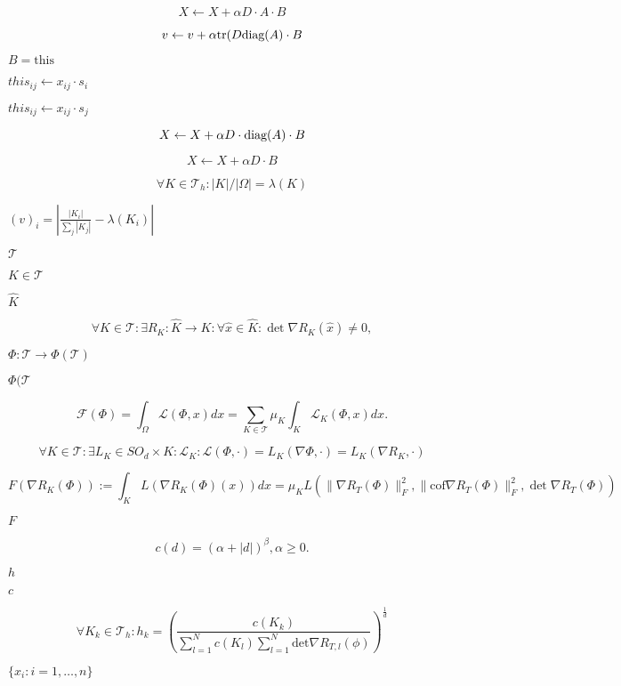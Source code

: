 \documentclass{article}
\begin{document}
\[ X \leftarrow X + \alpha D\cdot A\cdot B\]
\pagebreak

\[ v \leftarrow v + \alpha \mathrm{tr}( D \textnormal{diag}(A) \cdot B\]
\pagebreak

$ B = \mathrm{this} $
\pagebreak

$ this_{ij} \leftarrow x_{ij}\cdot s_i$
\pagebreak

$ this_{ij} \leftarrow x_{ij}\cdot s_j$
\pagebreak

\[ X \leftarrow X + \alpha D\cdot \textnormal{diag}(A)\cdot B\]
\pagebreak

\[ X \leftarrow X + \alpha D\cdot B\]
\pagebreak

\[
  \forall K \in \mathcal{T}_h: |K|/|\Omega| = \lambda(K)
\]
\pagebreak

$(v)_i = \left| \frac{|K_i|}{\sum_j |K_j|} - \lambda(K_i) \right| $
\pagebreak

$ \mathcal{T} $
\pagebreak

$ K \in \mathcal{T} $
\pagebreak

$ \hat{K} $
\pagebreak

\[
  \forall K \in \mathcal{T}: \exists R_K : \hat{K} \to K: \forall \hat{x} \in \hat{K}: \det \nabla
  R_K(\hat{x}) \neq 0,
\]
\pagebreak

$ \Phi: \mathcal{T} \to \Phi(\mathcal{T})$
\pagebreak

$ \Phi(\mathcal{T} $
\pagebreak

\[
  \mathcal{F}(\Phi) = \int_\Omega \mathcal{L}(\Phi,x) dx = \sum_{K \in \mathcal{T}} \mu_K \int_K
  \mathcal{L}_K(\Phi,x) dx.
\]
\pagebreak

\[
  \forall K \in \mathcal{T}: \exists L_K \in SO_d \times K: \mathcal{L}_K: \mathcal{L}(\Phi,\cdot) =
  L_K(\nabla \Phi, \cdot) = L_K(\nabla R_K, \cdot)
\]
\pagebreak

\[
   F(\nabla R_K(\Phi))  := \int_K L(\nabla R_K (\Phi)(x)) dx = \mu_K L( \| \nabla R_T(\Phi) \|_F^2,
   \| \mathrm{cof} \nabla R_T(\Phi) \|_F^2, \det \nabla R_T(\Phi) )
\]
\pagebreak

$ F $
\pagebreak

\[
   c(d) = (\alpha + |d|)^\beta, \alpha \geq 0.
\]
\pagebreak

$ h $
\pagebreak

$ c $
\pagebreak

\[
  \forall K_k \in \mathcal{T}_h: h_k = \left( \frac{c (K_k)}{\sum_{l=1}^N c(K_l) \sum_{l=1}^N
  \mathrm{det} \nabla R_{T,l}(\phi)} \right)^{\frac{1}{d}}
\]
\pagebreak

$ \{ x_i : i=1, \dots, n \} $
\pagebreak
\end{document}

